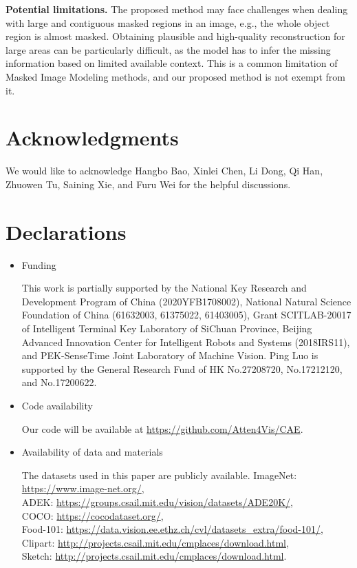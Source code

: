 \documentclass[twocolumn]{svjour3}          \smartqed  \usepackage{graphicx}
\begin{document}
\noindent \textbf{Potential limitations.} 
The proposed method may face challenges when dealing with
large and contiguous masked regions in an image,
e.g., the whole object region is almost masked. Obtaining plausible and high-quality reconstruction for large areas can be particularly difficult, as the model has to infer the missing information based on limited available context. This is a common limitation of Masked Image Modeling methods, and our proposed method is not exempt from it.


\section*{Acknowledgments}
We would like to acknowledge Hangbo Bao, Xinlei Chen, Li Dong, Qi Han, Zhuowen Tu, Saining Xie, and Furu Wei for the helpful discussions.



\section*{Declarations}
\begin{itemize}
\item Funding

This work is partially supported by the National Key Research and Development
Program of China (2020YFB1708002), National Natural Science Foundation of China (61632003, 61375022, 61403005), Grant SCITLAB-20017 of Intelligent Terminal Key Laboratory of SiChuan Province, Beijing Advanced Innovation Center for Intelligent Robots and Systems (2018IRS11), and PEK-SenseTime Joint Laboratory of Machine Vision. Ping Luo is supported by the General Research Fund of HK No.27208720, No.17212120, and No.17200622.

\item Code availability 

Our code will be available at \url{https://github.com/Atten4Vis/CAE}.

\item Availability of data and materials

The datasets used in this paper are publicly available. 
ImageNet: \url{https://www.image-net.org/},\\ ADEK: \url{https://groups.csail.mit.edu/vision/datasets/ADE20K/}, \\
COCO: \url{https://cocodataset.org/}, \\
{Food-101}: \url{https://data.vision.ee.ethz.ch/cvl/datasets_extra/food-101/}, \\
{Clipart}: \url{http://projects.csail.mit.edu/cmplaces/download.html},\\
{Sketch}: \url{http://projects.csail.mit.edu/cmplaces/download.html}.



\end{itemize}






\end{document}
